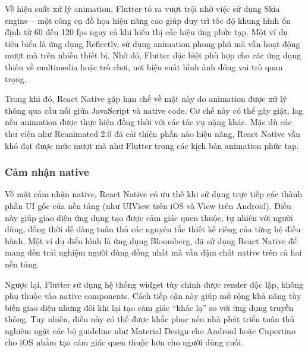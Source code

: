 \begin{flushleft}
    \hspace*{0.8cm}Về hiệu suất xử lý animation, Flutter tỏ ra vượt trội nhờ việc sử dụng Skia engine – một công cụ đồ họa hiệu năng cao giúp duy trì tốc độ khung hình ổn định từ 60 đến 120 fps ngay cả khi hiển thị các hiệu ứng phức tạp. Một ví dụ tiêu biểu là ứng dụng Reflectly, sử dụng animation phong phú mà vẫn hoạt động mượt mà trên nhiều thiết bị. Nhờ đó, Flutter đặc biệt phù hợp cho các ứng dụng thiên về multimedia hoặc trò chơi, nơi hiệu suất hình ảnh đóng vai trò quan trọng.

    \vspace{0.5em}

    \hspace*{1.5em}Trong khi đó, React Native gặp hạn chế về mặt này do animation được xử lý thông qua cầu nối giữa JavaScript và native code. Cơ chế này có thể gây giật, lag nếu animation được thực hiện đồng thời với các tác vụ nặng khác. Mặc dù các thư viện như Reanimated 2.0 đã cải thiện phần nào hiệu năng, React Native vẫn khó đạt được mức mượt mà như Flutter trong các kịch bản animation phức tạp.
\end{flushleft}

\subsubsection{Cảm nhận native}

\begin{flushleft}
    \hspace*{0.8cm}Về mặt cảm nhận native, React Native có ưu thế khi sử dụng trực tiếp các thành phần UI gốc của nền tảng (như UIView trên iOS và View trên Android). Điều này giúp giao diện ứng dụng tạo được cảm giác quen thuộc, tự nhiên với người dùng, đồng thời dễ dàng tuân thủ các nguyên tắc thiết kế riêng của từng hệ điều hành. Một ví dụ điển hình là ứng dụng Bloomberg, đã sử dụng React Native để mang đến trải nghiệm người dùng đồng nhất mà vẫn đậm chất native trên cả hai nền tảng.

    \vspace{0.5em}

    \hspace*{1.5em}Ngược lại, Flutter sử dụng hệ thống widget tùy chỉnh được render độc lập, không phụ thuộc vào native components. Cách tiếp cận này giúp mở rộng khả năng tùy biến giao diện nhưng đôi khi lại tạo cảm giác “khác lạ” so với ứng dụng truyền thống. Tuy nhiên, điều này có thể được khắc phục nếu nhà phát triển tuân thủ nghiêm ngặt các bộ guideline như Material Design cho Android hoặc Cupertino cho iOS nhằm tạo cảm giác quen thuộc hơn cho người dùng cuối.
\end{flushleft}


